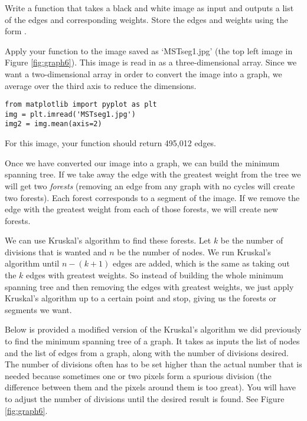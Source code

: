 \begin{problem}
Write a function that takes a black and white image as input and outputs a list of the edges and corresponding weights. Store the edges and weights using the form .

Apply your function to the image saved as `MSTseg1.jpg' (the top left image in Figure \ref{fig:graph6}). This image is read in as a three-dimensional array. Since we want a two-dimensional array in order to convert the image into a graph, we average over the third axis to reduce the dimensions.

\begin{lstlisting}
from matplotlib import pyplot as plt
img = plt.imread('MSTseg1.jpg')
img2 = img.mean(axis=2)
\end{lstlisting}
For this image, your function should return 495,012 edges.
\label{problem4}
\end{problem}



Once we have converted our image into a graph, we can build the minimum spanning tree. If we take away the edge with the greatest weight from the tree we will get two \emph{forests} (removing an edge from any graph with no cycles will create two forests). Each forest corresponds to a segment of the image. If we remove the edge with the greatest weight from each of those forests, we will create new forests.  

We can use Kruskal's algorithm to find these forests. Let $k$ be the number of divisions that is wanted and $n$ be the number of nodes. We run Kruskal's algorithm until $n-(k+1)$ edges are added, which is the same as taking out the $k$ edges with greatest weights. So instead of building the whole minimum spanning tree and then removing the edges with greatest weights, we just apply Kruskal's algorithm up to a certain point and stop, giving us the forests or segments we want.


Below is provided a modified version of the Kruskal's algorithm we did previously to find the minimum spanning tree of a graph. It takes as inputs the list of nodes and the list of edges from a graph, along with the number of divisions desired. The number of divisions often has to be set higher than the actual number that is needed because sometimes one or two pixels form a spurious division (the difference between them and the pixels around them is too great).
You will have to adjust the number of divisions until the desired result is found.  See Figure \ref{fig:graph6}.

